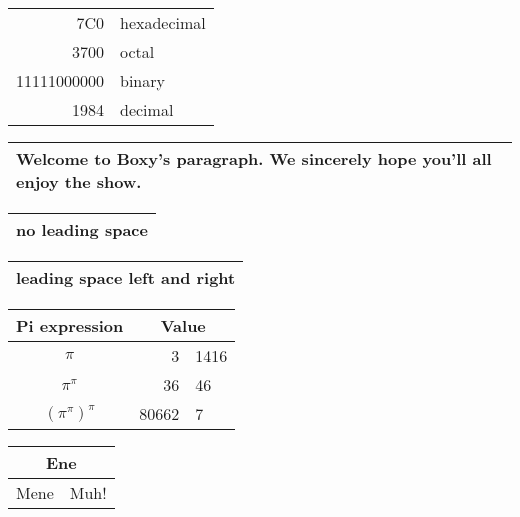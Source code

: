\documentclass[a4paper,11pt,twocolumn]{article}
\begin{document}
\begin{tabular}{|r|l|}
\hline
7C0 & hexadecimal \\
3700 & octal \\ \cline{2-2}
11111000000 & binary \\
\hline \hline
1984 & decimal \\
\hline
\end{tabular}

\begin{tabular}{|p{4.7cm}|}
\hline
Welcome to Boxy’s paragraph.
We sincerely hope you’ll
all enjoy the show.\\
\hline
\end{tabular}


\begin{tabular}{@{} l @{}}
\hline
no leading space\\
\hline
\end{tabular}

\begin{tabular}{l}
\hline
leading space left and right\\
\hline
\end{tabular}

\begin{tabular}{c r @{.} l}
Pi expression &
\multicolumn{2}{c}{Value} \\
\hline
$\pi$ & 3&1416 \\
$\pi^{\pi}$ & 36&46 \\
$(\pi^{\pi})^{\pi}$ & 80662&7 \\
\end{tabular}

\begin{tabular}{|c|c|}
\hline
\multicolumn{2}{|c|}{Ene} \\
\hline
Mene & Muh! \\
\hline
\end{tabular}
\end{document}
